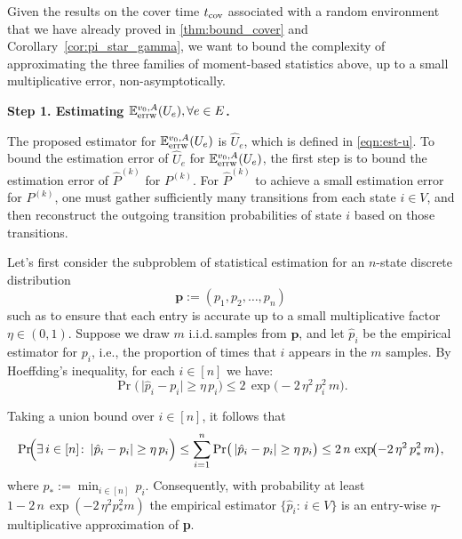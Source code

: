 \documentclass[a4paper, 11pt]{article}
\newcommand{\E}{\mathbb{E}}
\newcommand{\Eerrw}{\E_{\textnormal{errw}}}
\newcommand{\cov}{\textnormal{cov}}
\begin{document}
Given the results on the cover time $t_\cov$ associated with a random environment that we have already proved in \cref{thm:bound_cover} and Corollary~\ref{cor:pi_star_gamma}, we want to bound the complexity of approximating the three families of moment-based statistics above, up to a small multiplicative error, non-asymptotically. 

\textbf{Step 1. Estimating $\Eerrw^{v_0,A} (U_e),\forall e\in E$.}

The proposed estimator for $\Eerrw^{v_0,A} (U_e)$
is $\hat{U}_e$, which is
defined in \cref{eqn:est-u}.
To bound the estimation error of $\hat{U}_e$ for $\Eerrw^{v_0,A}(U_e)$, the first step is to bound the estimation error of $\hat{P}^{(k)}$ for $P^{(k)}$. For $\hat{P}^{(k)}$ to achieve a small estimation error for $P^{(k)}$, one must gather sufficiently many transitions from each state $i\in V$, and then reconstruct the outgoing transition probabilities of state $i$ based on those transitions.

Let's first consider the subproblem of statistical estimation for an $n$-state discrete distribution 
\[
  \mathbf{p} := (p_1, p_2, \ldots, p_n)
\]
such as to ensure that each entry is accurate up to a small multiplicative factor $\eta \in (0,1)$.  
Suppose we draw $m$ i.i.d.\,samples from $\mathbf{p}$, and let $\hat{p}_i$ be the empirical estimator for $p_i$, i.e., the proportion of times that $i$ appears in the $m$ samples. By Hoeffding's inequality, for each $i\in[n]$ we have:
\begin{equation}
\label{eqn:errw-discrete_dist1}
  \Pr\bigl(\,\lvert \hat{p}_i - p_i\rvert 
            \ge \eta \, p_i\bigr)
  \le
  2\, \exp\!\bigl(-2\,\eta^2\,p_i^2\,m\bigr).
\end{equation}

Taking a union bound over $i\in[n]$, it follows that
\begin{equation}
\label{eqn:errw-discrete_dist2}
  \Pr\!\Bigl(\exists \, i \in [n] \colon\,
       \lvert \hat{p}_i - p_i\rvert 
       \ge \eta \,p_i\Bigr)
  \le
  \sum_{i=1}^n \Pr\bigl(\,\lvert \hat{p}_i - p_i\rvert 
            \ge \eta \, p_i\bigr)
  \le
  2\,n \,\exp\!\bigl(-2\,\eta^2\,p_*^2\,m\bigr),
\end{equation}
where $p_* := \min_{i\in[n]} \, p_i$. Consequently, with probability at least $1 - 2\,n\,\exp(-2\,\eta^2 p_*^2 m)$ the empirical estimator $\{\hat{p}_i:\,i\in V\}$ is an entry-wise $\eta$-multiplicative 
approximation of \textbf{p}. 
\end{document}
